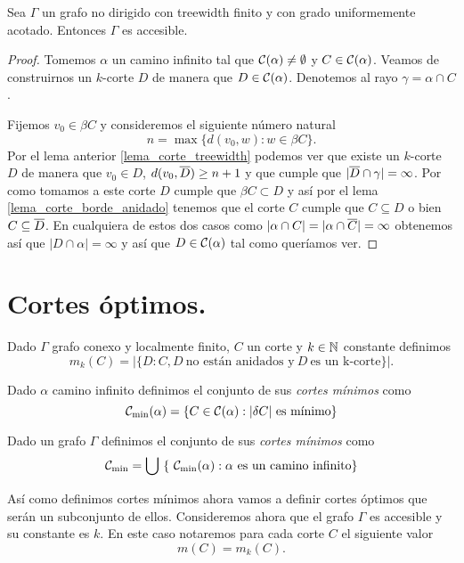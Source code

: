\documentclass[tesis.tex]{subfiles}
\begin{document}
\begin{teo}\label{teo_treewidth_fin_accesible}
	Sea $\Gamma$ un grafo no dirigido con treewidth finito y con grado uniformemente acotado.
	Entonces $\Gamma$ es accesible.
\end{teo}
\begin{proof}
	Tomemos $\alpha$ un camino infinito tal que ${\cal C}(\alpha) \neq \emptyset$ y $C \in {\cal C}(\alpha)$.
	Veamos de construirnos un $k$-corte $D$ de manera que $D \in {\cal C}(\alpha)$.
	Denotemos al rayo $\gamma = \alpha \cap C$.
	
	Fijemos $v_0  \in \beta C$ y consideremos el siguiente número natural
	\[
	n = \max \{ d(v_0,w) : w \in \beta C  \}.
	\]
	Por el lema anterior \ref{lema_corte_treewidth} podemos ver que existe un $k$-corte $D$ de manera que $v_{0} \in D$, $d(v_0, \overline D) \ge n+1$ y que cumple que $|\overline D \cap \gamma| = \infty$.
	Por como tomamos a este corte $D$ cumple que $\beta C \subset D$ y así por el lema \ref{lema_corte_borde_anidado} tenemos que el corte $C$ cumple que 
	$C \subseteq D$ o bien $C \subseteq \overline D$.
	En cualquiera de estos dos casos como $|\alpha \cap C| = |\alpha \cap \overline  C| = \infty$ obtenemos así que $|D \cap \alpha|=\infty$ y así que $D \in {\cal C}(\alpha)$ tal como queríamos ver. 
	
\end{proof}


\section{Cortes óptimos.}

\begin{deff}
	Dado $\Gamma$ grafo conexo y localmente finito, $C$ un corte y $k \in \mathbb{N}$ constante definimos
	\[
	m_k(C) = | \{  D : C, D \ \text{no están anidados y} \ D \ \text{es un k-corte}   \} |. 
	\]
\end{deff}

\begin{deff}
	Dado $\alpha$ camino infinito definimos el conjunto de sus \emph{cortes mínimos} como
	\[
	\cam = \{  C \in \ca : |\delta C| \ \text{es mínimo}  \}
	\]
	
	Dado un grafo $\Gamma$ definimos el conjunto de sus \emph{cortes mínimos} como 
	\[
	{\cal C}_{\text{min}} = \bigcup \ \{ \ {\cal C}_{\text{min}}(\alpha) : \alpha \ \text{es un camino infinito}  \}
	\]
\end{deff}


Así como definimos cortes mínimos ahora vamos a definir cortes óptimos que serán un subconjunto de ellos.
Consideremos ahora que el grafo $\Gamma$ es accesible y su constante es $k$.
En este caso notaremos para cada corte $C$ el siguiente valor
\[
m(C) = m_k(C).
\]
\end{document}
